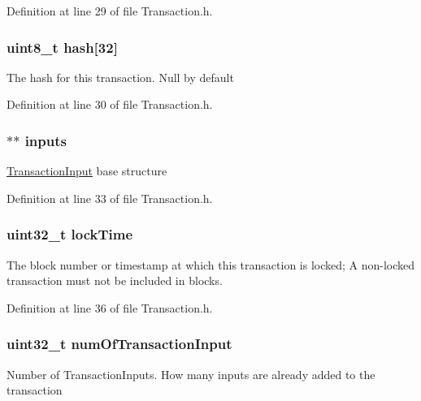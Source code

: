 Definition at line 29 of file Transaction.h.

\hypertarget{struct_transaction_a7ff9da008bf055da1f1ba994c562057d}{
\subsubsection[{hash}]{\setlength{\rightskip}{0pt plus 5cm}uint8\_\-t {\bf hash}\mbox{[}32\mbox{]}}}
\label{struct_transaction_a7ff9da008bf055da1f1ba994c562057d}
The hash for this transaction. Null by default 

Definition at line 30 of file Transaction.h.

\hypertarget{struct_transaction_a00cc03d624a6aef1bfeadcbe9dcde0fe}{
\subsubsection[{inputs}]{$\ast$$\ast$ {\bf inputs}}}
\label{struct_transaction_a00cc03d624a6aef1bfeadcbe9dcde0fe}
\hyperlink{struct_transaction_input}{TransactionInput} base structure 

Definition at line 33 of file Transaction.h.

\hypertarget{struct_transaction_aea4d95211b00c311b2d84c6177429162}{
\subsubsection[{lockTime}]{\setlength{\rightskip}{0pt plus 5cm}uint32\_\-t {\bf lockTime}}}
\label{struct_transaction_aea4d95211b00c311b2d84c6177429162}
The block number or timestamp at which this transaction is locked; A non-\/locked transaction must not be included in blocks. 

Definition at line 36 of file Transaction.h.

\hypertarget{struct_transaction_ab67f7dee599d2ca5988caa53883a44ed}{
\subsubsection[{numOfTransactionInput}]{\setlength{\rightskip}{0pt plus 5cm}uint32\_\-t {\bf numOfTransactionInput}}}
\label{struct_transaction_ab67f7dee599d2ca5988caa53883a44ed}
Number of TransactionInputs. How many inputs are already added to the transaction 

